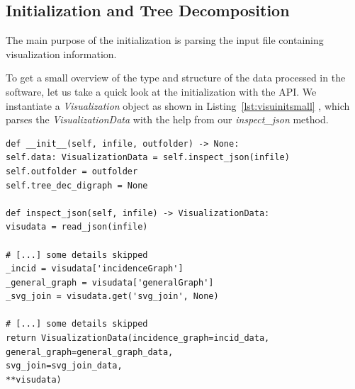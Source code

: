 \documentclass[a4paper, 12pt, bibliography=totoc]{scrartcl}
\begin{document}



\subsection{Initialization and Tree Decomposition}

The main purpose of the initialization is parsing the input file containing visualization information.

To get a small overview of the type and structure of the data processed in the software, let us take a quick look at the initialization with the API. We instantiate a \textit{Visualization} object as shown in Listing~\ref{lst:visuinitsmall} , which parses the \textit{VisualizationData} with the help from our \textit{inspect\_json} method. \pagebreak

\begin{lstlisting}[style=custompy, caption={Overview of data initialization}, label={lst:visuinitsmall}]
def __init__(self, infile, outfolder) -> None:
self.data: VisualizationData = self.inspect_json(infile)
self.outfolder = outfolder
self.tree_dec_digraph = None

def inspect_json(self, infile) -> VisualizationData:
visudata = read_json(infile)

# [...] some details skipped
_incid = visudata['incidenceGraph']
_general_graph = visudata['generalGraph']
_svg_join = visudata.get('svg_join', None)

# [...] some details skipped		
return VisualizationData(incidence_graph=incid_data,
general_graph=general_graph_data,
svg_join=svg_join_data, 
**visudata)
\end{lstlisting}

\end{document}
